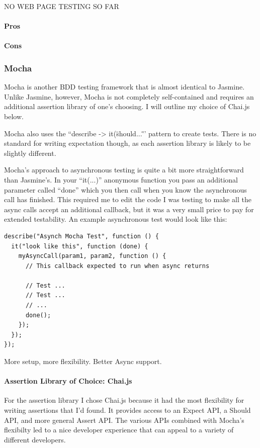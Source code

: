 \documentclass[11pt]{article}
\begin{document}
NO WEB PAGE TESTING SO FAR

\paragraph{Pros}

\paragraph{Cons}

\subsubsection{Mocha \cite{Mocha}}
Mocha is another BDD testing framework that is almost identical to Jasmine. Unlike Jasmine, however, Mocha is not completely self-contained and requires an additional assertion library of one's choosing. I will outline my choice of Chai.js below.

Mocha also uses the ``describe -> it(\"should...\" '' pattern to create tests. There is no standard for writing expectation though, as each assertion library is likely to be slightly different.

Mocha's approach to asynchronous testing is quite a bit more straightforward than Jasmine's. In your ``it(...)'' anonymous function you pass an additional parameter called ``done'' which you then call when you know the asynchronous call has finished. This required me to edit the code I was testing to make all the async calls accept an additional callback, but it was a very small price to pay for extended testability. An example asynchronous test would look like this:
\begin{lstlisting}
describe("Asynch Mocha Test", function () {
  it("look like this", function (done) {
    myAsyncCall(param1, param2, function () {
      // This callback expected to run when async returns

      // Test ...
      // Test ...
      // ...
      done();
    });
  });
});
\end{lstlisting}

More setup, more flexibility.
Better Async support.

\paragraph{Assertion Library of Choice: Chai.js \cite{Chaijs}}
For the assertion library I chose Chai.js because it had the most flexibility for writing assertions that I'd found. It provides access to an Expect API, a Should API, and more general Assert API. The various APIs combined with Mocha's flexibilty led to a nice developer experience that can appeal to a variety of different developers.
\end{document}
